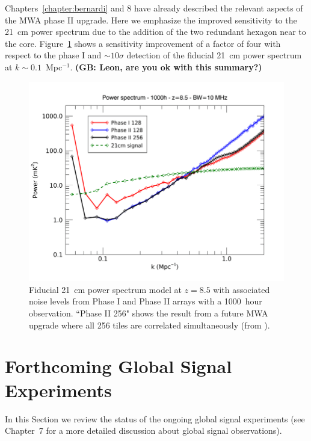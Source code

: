 Chapters~\ref{chapter:bernardi} and 8 have already described the relevant aspects of the MWA phase II upgrade. Here we emphasize the improved sensitivity to the 21~cm power spectrum due to the addition of the two redundant hexagon near to the core. Figure~\ref{fig:fig_mwa_phaseII_pspec} shows a sensitivity improvement of a factor of four with respect to the phase I and $\sim 10\sigma$ detection of the fiducial 21~cm power spectrum at $k \sim 0.1$~Mpc$^{-1}$. {\bf (GB: Leon, are you ok with this summary?)}
\begin{figure}[]
\begin{center}
\includegraphics[width=1.\textwidth]{Koopmans_Bernardi/mwa_phaseII_pspec}
\end{center}
\caption{Fiducial 21~cm power spectrum model at $z = 8.5$ with associated noise levels from Phase I and Phase II arrays with a 1000~hour observation. ``Phase II 256" shows the result from a future MWA upgrade where all 256 tiles are correlated simultaneously (from \cite{wayth18}).}
\label{fig:fig_mwa_phaseII_pspec}
\end{figure}




\section{Forthcoming Global Signal Experiments}

In this Section we review the status of the ongoing global signal experiments (see Chapter~7 for a more detailed discussion about global signal observations).

